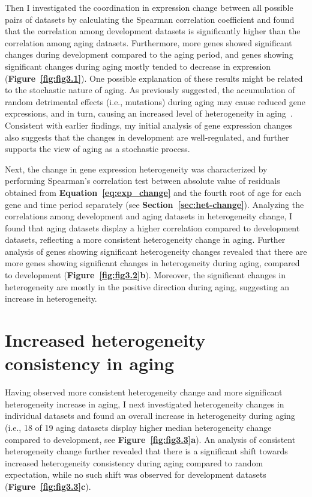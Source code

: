 Then I investigated the coordination in expression change between all possible pairs of datasets by calculating the Spearman correlation coefficient 
and found that the correlation among development datasets is significantly higher than the correlation among aging datasets.
Furthermore, more genes showed significant changes during development compared to the aging period, and genes showing significant changes during aging mostly tended to decrease in expression (\textbf{Figure~\ref{fig:fig3.1}}).
One possible explanation of these results might be related to the stochastic nature of aging. 
As previously suggested, the accumulation of random detrimental effects (i.e., mutations) during aging may cause reduced gene expressions, 
and in turn, causing an increased level of heterogeneity in aging~\autocite{Lu2004}.
Consistent with earlier findings, my initial analysis of gene expression changes also suggests that the changes in development are well-regulated,
and further supports the view of aging as a stochastic process.

Next, the change in gene expression heterogeneity was characterized 
by performing Spearman's correlation test between absolute value of residuals obtained from \textbf{Equation~\ref{eq:exp_change}} 
and the fourth root of age for each gene and time period separately (see \textbf{Section~\ref{sec:het-change}}).
Analyzing the correlations among development and aging datasets in heterogeneity change,
I found that aging datasets display a higher correlation compared to development datasets, 
reflecting a more consistent heterogeneity change in aging.
Further analysis of genes showing significant heterogeneity changes revealed that 
there are more genes showing significant changes in heterogeneity during aging, compared to development (\textbf{Figure~\ref{fig:fig3.2}b}). 
Moreover, the significant changes in heterogeneity are mostly in the positive direction during aging, suggesting an increase in heterogeneity.

\section{Increased heterogeneity consistency in aging}
Having observed more consistent heterogeneity change and more significant heterogeneity increase in aging, 
I next investigated heterogeneity changes in individual datasets and found an overall increase in heterogeneity during aging 
(i.e., 18 of 19 aging datasets display higher median heterogeneity change compared to development, see \textbf{Figure~\ref{fig:fig3.3}a}). 
An analysis of consistent heterogeneity change further revealed that there is a significant shift towards increased heterogeneity consistency during aging compared to random expectation,
while no such shift was observed for development datasets (\textbf{Figure~\ref{fig:fig3.3}c}).

